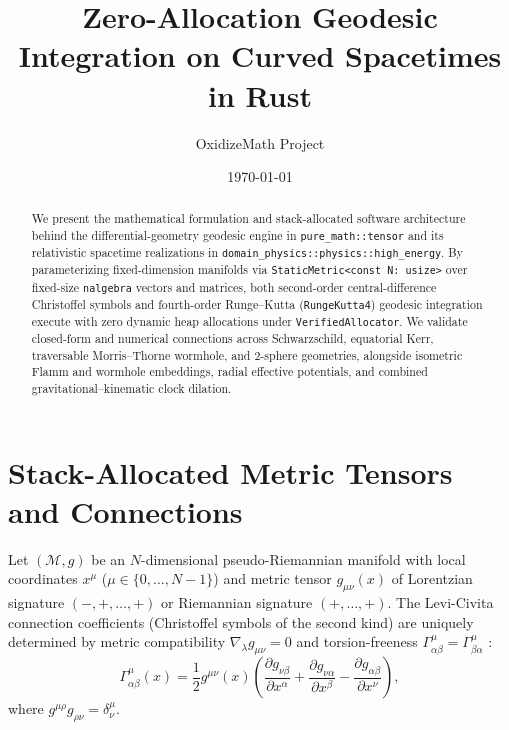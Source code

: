 \documentclass[12pt]{article}
\title{Zero-Allocation Geodesic Integration on Curved Spacetimes in Rust}
\author{OxidizeMath Project}
\date{\today}
\begin{document}
\maketitle

\begin{abstract}
We present the mathematical formulation and stack-allocated software architecture behind the differential-geometry geodesic engine in \texttt{pure\_math::tensor} and its relativistic spacetime realizations in \texttt{domain\_physics::physics::high\_energy}. By parameterizing fixed-dimension manifolds via \texttt{StaticMetric<const N: usize>} over fixed-size \texttt{nalgebra} vectors and matrices, both second-order central-difference Christoffel symbols and fourth-order Runge--Kutta (\texttt{RungeKutta4}) geodesic integration execute with zero dynamic heap allocations under \texttt{VerifiedAllocator}. We validate closed-form and numerical connections across Schwarzschild, equatorial Kerr, traversable Morris--Thorne wormhole, and 2-sphere geometries, alongside isometric Flamm and wormhole embeddings, radial effective potentials, and combined gravitational--kinematic clock dilation.
\end{abstract}

\section{Stack-Allocated Metric Tensors and Connections}

Let $(\mathcal{M}, g)$ be an $N$-dimensional pseudo-Riemannian manifold with local coordinates $x^\mu$ ($\mu \in \{0, \dots, N-1\}$) and metric tensor $g_{\mu\nu}(x)$ of Lorentzian signature $(-, +, \dots, +)$ or Riemannian signature $(+, \dots, +)$. The Levi-Civita connection coefficients (Christoffel symbols of the second kind) are uniquely determined by metric compatibility $\nabla_\lambda g_{\mu\nu} = 0$ and torsion-freeness $\Gamma^\mu_{\alpha\beta} = \Gamma^\mu_{\beta\alpha}$ \cite{misner1973gravitation}:
\begin{equation}
\Gamma^\mu_{\alpha\beta}(x) = \frac{1}{2} g^{\mu\nu}(x) \left(
    \frac{\partial g_{\nu\beta}}{\partial x^\alpha}
  + \frac{\partial g_{\nu\alpha}}{\partial x^\beta}
  - \frac{\partial g_{\alpha\beta}}{\partial x^\nu}
\right),
\label{eq:christoffel}
\end{equation}
where $g^{\mu\rho} g_{\rho\nu} = \delta^\mu_\nu$.
\end{document}

